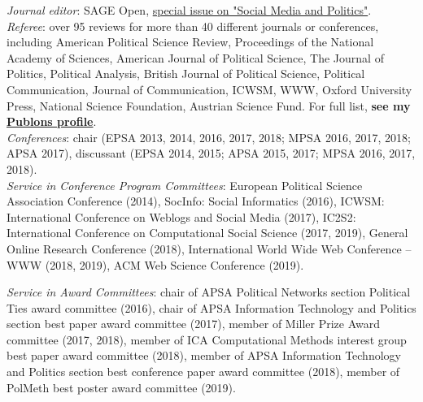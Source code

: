 \documentclass[margin,line,11pt]{resume}
\newcommand{\nl}{\vspace{0.10in}\\}
\begin{document}
\begin{resume}
\emph{Journal editor}: SAGE Open, \href{https://journals.sagepub.com/topic/sgo-subjects/3468/sgo}{special issue on "Social Media and Politics"}.\nl
\emph{Referee}: over 95 reviews for more than 40 different journals or conferences, including American Political Science Review, Proceedings of the National Academy of Sciences, American Journal of Political Science, The Journal of Politics, Political Analysis, British Journal of Political Science, Political Communication, Journal of Communication, ICWSM, WWW, Oxford University Press, National Science Foundation, Austrian Science Fund. For full list, \textbf{see my \href{https://publons.com/author/1291880/pablo-barbera}{Publons profile}}.\nl
\emph{Conferences}: chair (EPSA 2013, 2014, 2016, 2017, 2018; MPSA 2016, 2017, 2018; APSA 2017), discussant (EPSA 2014, 2015; APSA 2015, 2017; MPSA 2016, 2017, 2018).\nl
\emph{Service in Conference Program Committees}: European Political Science Association Conference (2014), SocInfo: Social Informatics (2016), ICWSM: International Conference on Weblogs and Social Media (2017), IC2S2: International Conference on Computational Social Science (2017, 2019), General Online Research Conference (2018),  International World Wide Web Conference -- WWW (2018, 2019), ACM Web Science Conference (2019).\nl

\newpage

\emph{Service in Award Committees}: chair of APSA Political Networks section Political Ties award committee (2016), chair of APSA Information Technology and Politics section best paper award committee (2017), member of Miller Prize Award committee (2017, 2018), member of ICA Computational Methods interest group best paper award committee (2018), member of APSA Information Technology and Politics section best conference paper award committee (2018), member of PolMeth best poster award committee (2019).


\end{resume}
\end{document}
